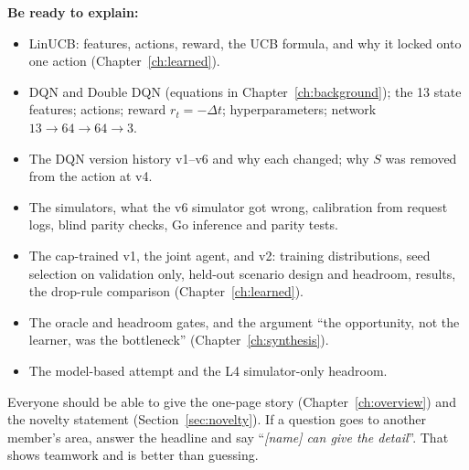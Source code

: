 \textbf{Be ready to explain:}
\begin{itemize}
\item LinUCB: features, actions, reward, the UCB formula, and why it locked onto one action (Chapter~\ref{ch:learned}).
\item DQN and Double DQN (equations in Chapter~\ref{ch:background}); the 13 state features; actions; reward $r_t=-\Delta t$; hyperparameters; network $13\to64\to64\to3$.
\item The DQN version history v1--v6 and why each changed; why $S$ was removed from the action at v4.
\item The simulators, what the v6 simulator got wrong, calibration from request logs, blind parity checks, Go inference and parity tests.
\item The cap-trained v1, the joint agent, and v2: training distributions, seed selection on validation only, held-out scenario design and headroom, results, the drop-rule comparison (Chapter~\ref{ch:learned}).
\item The oracle and headroom gates, and the argument ``the opportunity, not the learner, was the bottleneck'' (Chapter~\ref{ch:synthesis}).
\item The model-based attempt and the L4 simulator-only headroom.
\end{itemize}

\begin{vivatip}
Everyone should be able to give the one-page story (Chapter~\ref{ch:overview}) and the novelty statement (Section~\ref{sec:novelty}). If a question goes to another member's area, answer the headline and say ``\emph{[name] can give the detail}''. That shows teamwork and is better than guessing.
\end{vivatip}
